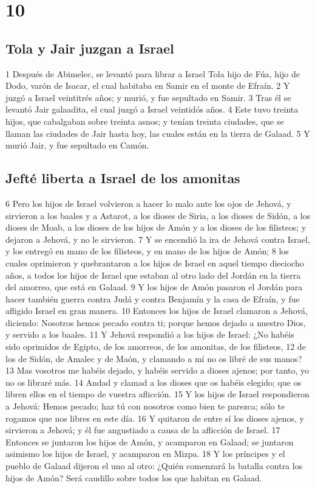 \chapter{10}

\section*{Tola y Jair juzgan a Israel}

1 Después de Abimelec, se levantó para librar a Israel Tola hijo de Fúa, hijo de Dodo, varón de Isacar, el cual habitaba en Samir en el monte de Efraín. 
2 Y juzgó a Israel veintitrés años; y murió, y fue sepultado en Samir.
3 Tras él se levantó Jair galaadita, el cual juzgó a Israel veintidós años.
4 Este tuvo treinta hijos, que cabalgaban sobre treinta asnos; y tenían treinta ciudades, que se llaman las ciudades de Jair hasta hoy, las cuales están en la tierra de Galaad.
5 Y murió Jair, y fue sepultado en Camón.

\section*{Jefté liberta a Israel de los amonitas}

6 Pero los hijos de Israel volvieron a hacer lo malo ante los ojos de Jehová, y sirvieron a los baales y a Astarot, a los dioses de Siria, a los dioses de Sidón, a los dioses de Moab, a los dioses de los hijos de Amón y a los dioses de los filisteos; y dejaron a Jehová, y no le sirvieron.
7 Y se encendió la ira de Jehová contra Israel, y los entregó en mano de los filisteos, y en mano de los hijos de Amón;
8 los cuales oprimieron y quebrantaron a los hijos de Israel en aquel tiempo dieciocho años, a todos los hijos de Israel que estaban al otro lado del Jordán en la tierra del amorreo, que está en Galaad.
9 Y los hijos de Amón pasaron el Jordán para hacer también guerra contra Judá y contra Benjamín y la casa de Efraín, y fue afligido Israel en gran manera.
10 Entonces los hijos de Israel clamaron a Jehová, diciendo: Nosotros hemos pecado contra ti; porque hemos dejado a nuestro Dios, y servido a los baales.
11 Y Jehová respondió a los hijos de Israel: ¿No habéis sido oprimidos de Egipto, de los amorreos, de los amonitas, de los filisteos,
12 de los de Sidón, de Amalec y de Maón, y clamando a mí no os libré de sus manos?
13 Mas vosotros me habéis dejado, y habéis servido a dioses ajenos; por tanto, yo no os libraré más.
14 Andad y clamad a los dioses que os habéis elegido; que os libren ellos en el tiempo de vuestra aflicción.
15 Y los hijos de Israel respondieron a Jehová: Hemos pecado; haz tú con nosotros como bien te parezca; sólo te rogamos que nos libres en este día.
16 Y quitaron de entre sí los dioses ajenos, y sirvieron a Jehová; y él fue angustiado a causa de la aflicción de Israel.
17 Entonces se juntaron los hijos de Amón, y acamparon en Galaad; se juntaron asimismo los hijos de Israel, y acamparon en Mizpa.
18 Y los príncipes y el pueblo de Galaad dijeron el uno al otro: ¿Quién comenzará la batalla contra los hijos de Amón? Será caudillo sobre todos los que habitan en Galaad.

